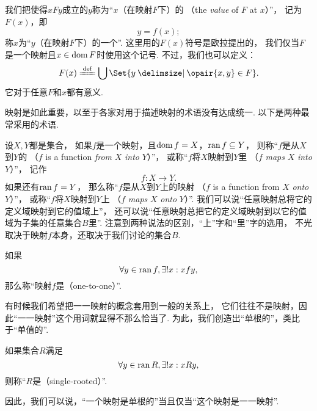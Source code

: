 我们把使得\(xFy\)成立的\(y\)称为“\(x\)（在映射\(F\)下）的%
（the \emph{value} of \(F\) at \(x\)）”，
记为\(F(x)\)，即\[
	y = f(x);
\]
称\(x\)为“\(y\)（在映射\(F\)下）的一个”.
这里用的\(F(x)\)符号是欧拉提出的，
我们仅当\(F\)是一个映射且\(x\in\operatorname{dom} F\)时使用这个记号.
不过，我们也可以定义：\[
	F(x) \defeq \bigcup\Set{ y \given \opair{x,y} \in F }.
\]
它对于任意\(F\)和\(x\)都有意义.

映射是如此重要，以至于各家对用于描述映射的术语没有达成统一.
以下是两种最常采用的术语.

设\(X,Y\)都是集合，
如果\(f\)是一个映射，且\(\operatorname{dom} f = X\)，\(\operatorname{ran} f \subseteq Y\)，
则称“\(f\)是从\(X\)到\(Y\)的%
（\(f\) is a function \emph{from} \(X\) \emph{into} \(Y\)）”，
或称“\(f\)将\(X\)映射到\(Y\)里%
（\(f\) \emph{maps} \(X\) \emph{into} \(Y\)）”，
记作\[
	f\colon X \to Y.
\]
如果还有\(\operatorname{ran} f = Y\)，
那么称“\(f\)是从\(X\)到\(Y\)上的映射%
（\(f\) is a function from \(X\) \emph{onto} \(Y\)）”，
或称“\(f\)将\(X\)映射到\(Y\)上%
（\(f\) \emph{maps} \(X\) \emph{onto} \(Y\)）”.
我们可以说“任意映射总将它的定义域映射到它的值域上”，
还可以说“任意映射总把它的定义域映射到以它的值域为子集的任意集合\(B\)里”.
注意到两种说法的区别，“上”字和“里”字的选用，
不光取决于映射\(f\)本身，还取决于我们讨论的集合\(B\).

如果\[
	\forall y \in \operatorname{ran} f,
	\exists! x:
	x f y,
\]
那么称“映射\(f\)是（one-to-one）”.

有时候我们希望把一一映射的概念套用到一般的关系上，
它们往往不是映射，因此“一一映射”这个用词就显得不那么恰当了.
为此，我们创造出“单根的”，类比于“单值的”.

\begin{definition}
如果集合\(R\)满足\[
	\forall y \in \operatorname{ran} R,
	\exists! x:
	x R y,
\]
则称“\(R\)是（single-rooted）”.
\end{definition}

因此，我们可以说，“一个映射是单根的”当且仅当“这个映射是一一映射”.


